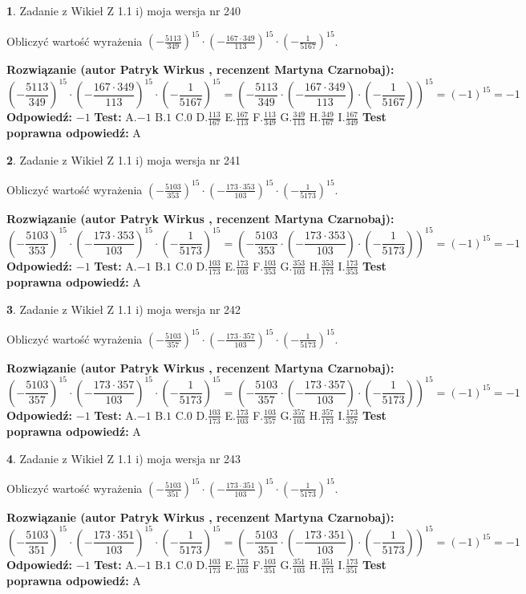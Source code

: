 \documentclass[12pt, a4paper]{article}
\theoremstyle{definition} %
\newtheorem{zad}{}
\newcommand{\zadStart}[1]{\begin{zad}#1\newline}
\newcommand{\zadStop}{\end{zad}}
\newcommand{\rozwStart}[2]{\noindent \textbf{Rozwiązanie (autor #1 , recenzent #2): }\newline}
\newcommand{\rozwStop}{\newline}
\newcommand{\odpStart}{\noindent \textbf{Odpowiedź:}\newline}
\newcommand{\odpStop}{\newline}
\newcommand{\testStart}{\noindent \textbf{Test:}\newline}
\newcommand{\testStop}{\newline}
\newcommand{\kluczStart}{\noindent \textbf{Test poprawna odpowiedź:}\newline}
\newcommand{\kluczStop}{\newline}
\begin{document}
\zadStart{Zadanie z Wikieł Z 1.1 i) moja wersja nr 240}

Obliczyć wartość wyrażenia $(-\frac{5113}{349})^{15} \cdot (-\frac{167 \cdot 349}{113})^{15} \cdot (-\frac{1}{5167})^{15}$.
\zadStop
\rozwStart{Patryk Wirkus}{Martyna Czarnobaj}
$$(-\frac{5113}{349})^{15} \cdot (-\frac{167 \cdot 349}{113})^{15} \cdot (-\frac{1}{5167})^{15} = (-\frac{5113}{349} \cdot (-\frac{167 \cdot 349}{113}) \cdot (-\frac{1}{5167}))^{15} = (-1)^{15} = -1$$
\rozwStop
\odpStart
$-1$
\odpStop
\testStart
A.$-1$ B.$1$ C.$0$ D.$\frac{113}{167}$ E.$\frac{167}{113}$
F.$\frac{113}{349}$ G.$\frac{349}{113}$
H.$\frac{349}{167}$
I.$\frac{167}{349}$
\testStop
\kluczStart
A
\kluczStop



\zadStart{Zadanie z Wikieł Z 1.1 i) moja wersja nr 241}

Obliczyć wartość wyrażenia $(-\frac{5103}{353})^{15} \cdot (-\frac{173 \cdot 353}{103})^{15} \cdot (-\frac{1}{5173})^{15}$.
\zadStop
\rozwStart{Patryk Wirkus}{Martyna Czarnobaj}
$$(-\frac{5103}{353})^{15} \cdot (-\frac{173 \cdot 353}{103})^{15} \cdot (-\frac{1}{5173})^{15} = (-\frac{5103}{353} \cdot (-\frac{173 \cdot 353}{103}) \cdot (-\frac{1}{5173}))^{15} = (-1)^{15} = -1$$
\rozwStop
\odpStart
$-1$
\odpStop
\testStart
A.$-1$ B.$1$ C.$0$ D.$\frac{103}{173}$ E.$\frac{173}{103}$
F.$\frac{103}{353}$ G.$\frac{353}{103}$
H.$\frac{353}{173}$
I.$\frac{173}{353}$
\testStop
\kluczStart
A
\kluczStop



\zadStart{Zadanie z Wikieł Z 1.1 i) moja wersja nr 242}

Obliczyć wartość wyrażenia $(-\frac{5103}{357})^{15} \cdot (-\frac{173 \cdot 357}{103})^{15} \cdot (-\frac{1}{5173})^{15}$.
\zadStop
\rozwStart{Patryk Wirkus}{Martyna Czarnobaj}
$$(-\frac{5103}{357})^{15} \cdot (-\frac{173 \cdot 357}{103})^{15} \cdot (-\frac{1}{5173})^{15} = (-\frac{5103}{357} \cdot (-\frac{173 \cdot 357}{103}) \cdot (-\frac{1}{5173}))^{15} = (-1)^{15} = -1$$
\rozwStop
\odpStart
$-1$
\odpStop
\testStart
A.$-1$ B.$1$ C.$0$ D.$\frac{103}{173}$ E.$\frac{173}{103}$
F.$\frac{103}{357}$ G.$\frac{357}{103}$
H.$\frac{357}{173}$
I.$\frac{173}{357}$
\testStop
\kluczStart
A
\kluczStop



\zadStart{Zadanie z Wikieł Z 1.1 i) moja wersja nr 243}

Obliczyć wartość wyrażenia $(-\frac{5103}{351})^{15} \cdot (-\frac{173 \cdot 351}{103})^{15} \cdot (-\frac{1}{5173})^{15}$.
\zadStop
\rozwStart{Patryk Wirkus}{Martyna Czarnobaj}
$$(-\frac{5103}{351})^{15} \cdot (-\frac{173 \cdot 351}{103})^{15} \cdot (-\frac{1}{5173})^{15} = (-\frac{5103}{351} \cdot (-\frac{173 \cdot 351}{103}) \cdot (-\frac{1}{5173}))^{15} = (-1)^{15} = -1$$
\rozwStop
\odpStart
$-1$
\odpStop
\testStart
A.$-1$ B.$1$ C.$0$ D.$\frac{103}{173}$ E.$\frac{173}{103}$
F.$\frac{103}{351}$ G.$\frac{351}{103}$
H.$\frac{351}{173}$
I.$\frac{173}{351}$
\testStop
\kluczStart
A
\kluczStop
\end{document}
